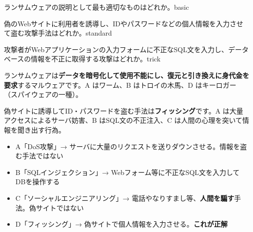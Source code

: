 
\begin{mondai}{ランサムウェアの説明として最も適切なものはどれか。}{basic}
\end{mondai}

\begin{mondai}{偽のWebサイトに利用者を誘導し、IDやパスワードなどの個人情報を入力させて盗む攻撃手法はどれか。}{standard}
\end{mondai}

\begin{mondai}{攻撃者がWebアプリケーションの入力フォームに不正なSQL文を入力し、データベースの情報を不正に取得する攻撃はどれか。}{trick}
\end{mondai}

\kaitoupage


\begin{kaisetsu}
ランサムウェアは\textbf{データを暗号化して使用不能にし、復元と引き換えに身代金を要求}するマルウェアです。A はワーム、B はトロイの木馬、D はキーロガー（スパイウェアの一種）。
\end{kaisetsu}


\begin{kaisetsu}
偽サイトに誘導してID・パスワードを盗む手法は\textbf{フィッシング}です。A は大量アクセスによるサーバ妨害、B はSQL文の不正注入、C は人間の心理を突いて情報を聞き出す行為。
\end{kaisetsu}

\begin{goutoubun}
\begin{itemize}
  \item A「DoS攻撃」→ サーバに大量のリクエストを送りダウンさせる。情報を盗む手法ではない
  \item B「SQLインジェクション」→ Webフォーム等に不正なSQL文を入力してDBを操作する
  \item C「ソーシャルエンジニアリング」→ 電話やなりすまし等、\textbf{人間を騙す}手法。偽サイトではない
  \item D「フィッシング」→ 偽サイトで個人情報を入力させる。\textbf{これが正解}
\end{itemize}
\end{goutoubun}

